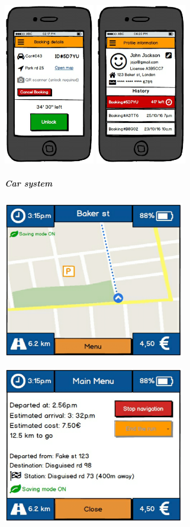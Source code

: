 \documentclass[]{article}
\let\oldsubparagraph\subparagraph
\renewcommand{\subparagraph}[1]{\oldsubparagraph{#1}\mbox{}}
\begin{document}
\includegraphics[width=1.56250in]{./MobileApp/MobileApp-5.png}
\includegraphics[width=1.56250in]{./MobileApp/MobileApp-6.png} \newpage

\subparagraph{\texorpdfstring{Car system
\newline \newline}{Car system }}\label{car-system}

\centerline{\includegraphics[width=3.12500in]{./CarSystem/CarSystem-1.png}}

\centerline{\includegraphics[width=3.12500in]{./CarSystem/CarSystem-2.png}}\newpage
\end{document}
